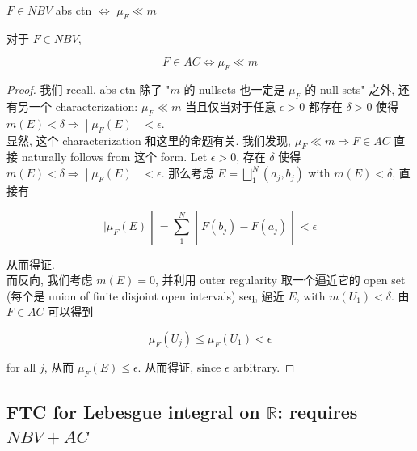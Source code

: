 \documentclass{qlnotes-export}
\begin{document}
\begin{lemma}{\(F \in NBV\) abs ctn \(\Leftrightarrow\) \(\mu_{F} \ll m\)}\label{lem-12-differentiation-on-real-spaces-f-in-nbv-abs-ctn-iff-mu-f-ll-m}

对于 \(F \in NBV\),

\[F \in AC\Leftrightarrow\mu_{F} \ll m\]

\end{lemma}

\begin{proof}

我们 recall, abs ctn 除了 "\(m\) 的 nullsets 也一定是 \(\mu_{F}\) 的 null sets" 之外, 还有另一个 characterization: \(\mu_{F} \ll m\) 当且仅当对于任意 \(\epsilon > 0\) 都存在 \(\delta > 0\) 使得 \(\left. m(E) < \delta\Longrightarrow \middle| \mu_{F}(E) \middle| < \epsilon \right.\).\\
显然, 这个 characterization 和这里的命题有关. 我们发现, \(\mu_{F} \ll m\Longrightarrow F \in AC\) 直接 naturally follows from 这个 form. Let \(\epsilon > 0\), 存在 \(\delta\) 使得 \(\left. m(E) < \delta\Longrightarrow \middle| \mu_{F}(E) \middle| < \epsilon \right.\). 那么考虑 \(E = \bigsqcup_{1}^{N}(a_{j},b_{j})\) with \(m(E) < \delta\), 直接有

\[\left. |\mu_{F}(E) \middle| = \sum\limits_{1}^{N} \middle| F(b_{j}) - F(a_{j}) \middle| < \epsilon \right.\]

从而得证.\\
而反向, 我们考虑 \(m(E) = 0\), 并利用 outer regularity 取一个逼近它的 open set (每个是 union of finite disjoint open intervals) seq, 逼近 \(E\), with \(m(U_{1}) < \delta\). 由 \(F \in AC\) 可以得到

\[\mu_{F}(U_{j}) \leq \mu_{F}(U_{1}) < \epsilon\]

for all \(j\), 从而 \(\mu_{F}(E) \leq \epsilon\). 从而得证, since \(\epsilon\) arbitrary.

\end{proof}

\subsection{\texorpdfstring{FTC for Lebesgue integral on \(\mathbb{R}\): requires \(NBV + AC\)}{FTC for Lebesgue integral on \textbackslash mathbb\{R\}: requires NBV + AC}}\label{ftc-for-lebesgue-integral-on-mathbbr-requires-nbv-ac}
\end{document}
